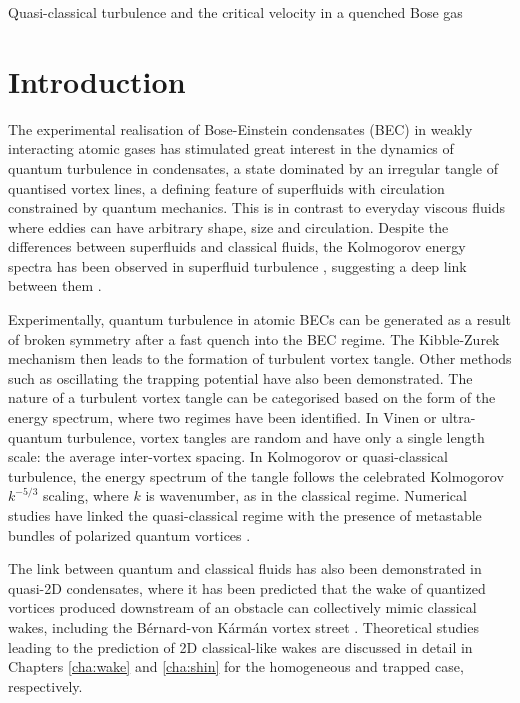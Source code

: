 \begin{chapter}{\label{cha:nonequib}Quasi-classical turbulence and the critical velocity in a quenched Bose gas}
\section{Introduction}
The experimental realisation of Bose-Einstein condensates (BEC) in weakly interacting atomic gases has stimulated great interest in the dynamics of quantum turbulence in condensates, a state dominated by an irregular tangle of quantised vortex lines, a defining feature of superfluids with circulation constrained by quantum mechanics. This is in contrast to everyday viscous fluids where eddies can have arbitrary shape, size and circulation.  Despite the differences between superfluids and classical fluids, the Kolmogorov energy spectra has been observed in superfluid turbulence \cite{Nore,Kobayashi,PhysRevLett.103.084501}, suggesting a deep link between them \cite{barenghi_skrbek_14}.

Experimentally, quantum turbulence in atomic BECs can be generated as a result of broken symmetry after a fast quench into the BEC regime. The Kibble-Zurek mechanism \cite{0305-4470-9-8-029,Zurek85,KZvort99} then leads to the formation of turbulent vortex tangle. Other methods such as oscillating the trapping potential \cite{Henn} have also been demonstrated. The nature of a turbulent vortex tangle can be categorised based on the form of the energy spectrum, where two regimes have been identified. In Vinen or ultra-quantum turbulence, vortex tangles are random and have only a single length scale: the average inter-vortex spacing. In Kolmogorov or quasi-classical turbulence, the energy spectrum of the tangle follows the celebrated Kolmogorov $k^{-5/3}$ scaling, where $k$ is wavenumber, as in the classical regime. Numerical studies have linked the quasi-classical regime with the presence of metastable bundles of polarized quantum vortices \cite{bagg12}.

The link between quantum and classical fluids has also been demonstrated in quasi-2D condensates, where it has been predicted that the wake of quantized vortices produced downstream of an obstacle can collectively mimic classical wakes, including the B{\' e}rnard-von K{\'a}rm{\' a}n vortex street \cite{saito10,stagg_parker_14,reeves_2015}. Theoretical studies leading to the prediction of 2D classical-like wakes are discussed in detail in Chapters \ref{cha:wake} and \ref{cha:shin} for the homogeneous and trapped case, respectively.


\end{chapter}
